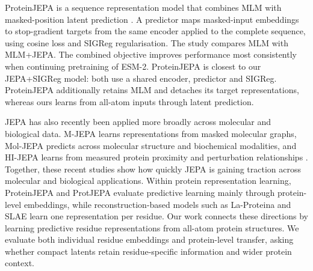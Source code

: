 \label{sec:related-work-proteinjepa}
ProteinJEPA is a sequence representation model that combines MLM with masked-position latent prediction \citep{ofer2026proteinjepa}.
A predictor maps masked-input embeddings to stop-gradient targets from the same encoder applied to the complete sequence, using cosine loss and SIGReg regularisation.
The study compares MLM with MLM+JEPA.
The combined objective improves performance most consistently when continuing pretraining of ESM-2.
ProteinJEPA is closest to our JEPA+SIGReg model: both use a shared encoder, predictor and SIGReg. ProteinJEPA additionally retains MLM and detaches its target representations, whereas ours learns from all-atom inputs through latent prediction.

\label{sec:related-work-gap}
\par\vspace{\baselineskip}\noindent
JEPA has also recently been applied more broadly across molecular and biological data. M-JEPA learns representations from masked molecular graphs, Mol-JEPA predicts across molecular structure and biochemical modalities, and HI-JEPA learns from measured protein proximity and perturbation relationships \citep{iyer2026mjepa,rottach2026moljepa,shihabi2026hijepa}. Together, these recent studies show how quickly JEPA is gaining traction across molecular and biological applications.
Within protein representation learning, ProteinJEPA and ProtJEPA evaluate predictive learning mainly through protein-level embeddings, while reconstruction-based models such as La-Proteina and SLAE learn one representation per residue. Our work connects these directions by learning predictive residue representations from all-atom protein structures. We evaluate both individual residue embeddings and protein-level transfer, asking whether compact latents retain residue-specific information and wider protein context.
